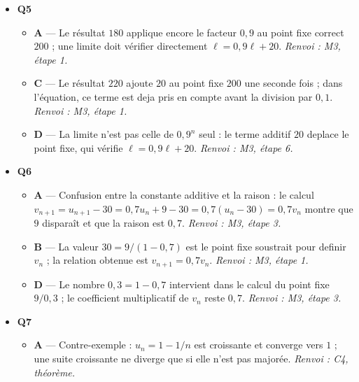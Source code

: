 \begin{itemize}
\begin{itemize}
    \item \textbf{B} — L'hypothèse $2^n>n$ ne donne pas directement $2^{n+1}>n+1$ : il faut multiplier par 2 puis comparer $2n$ et $n+1$. \emph{Renvoi : M2, redaction de l'heredite.}
    \item \textbf{C} — La chaine omet la justification finale $2n \geqslant n+1$, qui repose sur l'hypothèse $n \geqslant 1$. \emph{Renvoi : M2, redaction de l'heredite.}
    \item \textbf{D} — L'heredite suppose la propriété au rang $n$ et doit démontrer celle au rang $n+1$ ; redemontrer le rang $n$ ne fait pas avancer la preuve. \emph{Renvoi : M2, piège 2.}
  \end{itemize}
  \item \textbf{Q5}
  \begin{itemize}
    \item \textbf{A} — Le résultat $180$ applique encore le facteur $0{,}9$ au point fixe correct $200$ ; une limite doit vérifier directement $\ell=0{,}9\ell+20$. \emph{Renvoi : M3, étape 1.}
    \item \textbf{C} — Le résultat $220$ ajoute $20$ au point fixe $200$ une seconde fois ; dans l'équation, ce terme est deja pris en compte avant la division par $0{,}1$. \emph{Renvoi : M3, étape 1.}
    \item \textbf{D} — La limite n'est pas celle de $0{,}9^n$ seul : le terme additif $20$ deplace le point fixe, qui vérifie $\ell=0{,}9\ell+20$. \emph{Renvoi : M3, étape 6.}
  \end{itemize}
  \item \textbf{Q6}
  \begin{itemize}
    \item \textbf{A} — Confusion entre la constante additive et la raison : le calcul $v_{n+1}=u_{n+1}-30=0{,}7u_n+9-30=0{,}7(u_n-30)=0{,}7v_n$ montre que $9$ disparaît et que la raison est $0{,}7$. \emph{Renvoi : M3, étape 3.}
    \item \textbf{B} — La valeur $30=9/(1-0{,}7)$ est le point fixe soustrait pour definir $v_n$ ; la relation obtenue est $v_{n+1}=0{,}7v_n$. \emph{Renvoi : M3, étape 1.}
    \item \textbf{D} — Le nombre $0{,}3=1-0{,}7$ intervient dans le calcul du point fixe $9/0{,}3$ ; le coefficient multiplicatif de $v_n$ reste $0{,}7$. \emph{Renvoi : M3, étape 3.}
  \end{itemize}
  \item \textbf{Q7}
  \begin{itemize}
    \item \textbf{A} — Contre-exemple : $u_n = 1-1/n$ est croissante et converge vers $1$ ; une suite croissante ne diverge que si elle n'est pas majorée. \emph{Renvoi : C4, théorème.}

\end{itemize}
\end{itemize}

